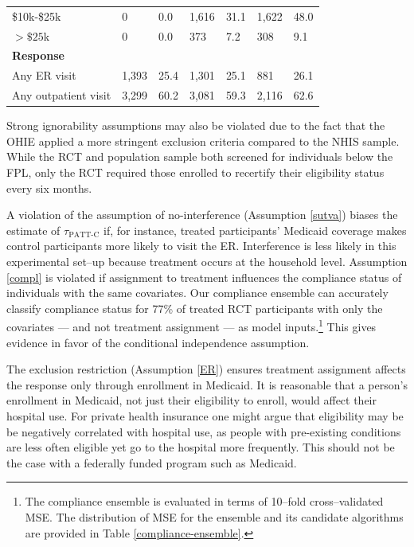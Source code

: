 \documentclass[hidelinks,12pt]{article}
\begin{document}
{\begin{singlespace}
\begin{longtable}{lllllll}
\hspace{3mm} \$10k-\$25k & 0 & 0.0 & 1,616 & 31.1 & 1,622 & 48.0 \\

\hspace{3mm} $>\$25$k & 0 & 0.0 & 373 & 7.2 & 308 & 9.1 \\
   \hline
\hline
 \textbf{Response} &   &  &  & &  &  \\ 
\hspace{3mm}Any ER visit &  1,393 & 25.4 & 1,301 & 25.1 & 881 & 26.1 \\ 
\hspace{3mm}Any outpatient visit & 3,299 & 60.2 & 3,081 & 59.3 & 2,116 & 62.6 \\ 
\hline
\hline
\end{longtable}
\end{singlespace}
\restoregeometry

{\color{red}Strong ignorability assumptions may also be violated due to the fact that the OHIE applied a more stringent exclusion criteria compared to the NHIS sample. While the RCT and population sample both screened for individuals below the FPL, only the RCT required those enrolled to recertify their eligibility status every six months.}

A violation of the assumption of no-interference (Assumption \ref{sutva}) biases the estimate of $\tau_{\text{PATT-C}}$ if, for instance, treated participants' Medicaid coverage makes control participants more likely to visit the ER. Interference is less likely in this experimental set--up because treatment occurs at the household level. Assumption \ref{compl} is violated if assignment to treatment influences the compliance status of individuals with the same covariates. Our compliance ensemble can accurately classify compliance status for 77\% of treated RCT participants with only the covariates --- and not treatment assignment --- as model inputs.\footnote{{\color{red}The compliance ensemble is evaluated in terms of 10--fold cross--validated MSE. The distribution of MSE for the ensemble and its candidate algorithms are provided in Table \ref{compliance-ensemble}.}}  This gives evidence in favor of the conditional independence assumption.

The exclusion restriction (Assumption \ref{ER}) ensures treatment assignment affects the response only through enrollment in Medicaid. It is reasonable that a person's enrollment in Medicaid, not just their eligibility to enroll, would affect their hospital use. For private health insurance one might argue that eligibility may be be negatively correlated with hospital use, as people with pre-existing conditions are less often eligible yet go to the hospital more frequently. This should not be the case with a federally funded program such as Medicaid. 

}
\end{document}
